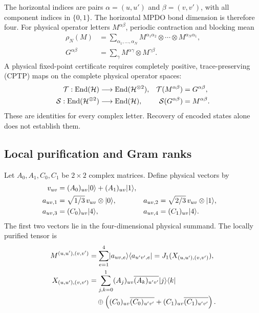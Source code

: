 The horizontal indices are pairs
$\alpha=(u,u')$ and $\beta=(v,v')$, with all component indices in
$\{0,1\}$. The horizontal MPDO bond dimension is therefore four.
For physical operator letters $M^{\alpha\beta}$, periodic contraction
and blocking mean
\begin{align}
	\rho_N(M)
	 & =\sum_{\alpha_1,\ldots,\alpha_N}
	M^{\alpha_1\alpha_2}\otimes\cdots\otimes
	M^{\alpha_N\alpha_1},
	\nonumber                                                \\
	G^{\alpha\beta}
	 & =\sum_\gamma M^{\alpha\gamma}\otimes M^{\gamma\beta}.
	\label{eq:contractions}
\end{align}
A physical fixed-point certificate requires completely positive,
trace-preserving (CPTP) maps on the complete physical operator spaces:
\begin{align}
	\mathcal{T}:\operatorname{End}(\mathcal{H})            & \longrightarrow\operatorname{End}(\mathcal{H}^{\otimes2}),
	                             &
	\mathcal{T}(M^{\alpha\beta})       & =G^{\alpha\beta},
	\nonumber                                                             \\
	\mathcal{S}:\operatorname{End}(\mathcal{H}^{\otimes2}) & \longrightarrow\operatorname{End}(\mathcal{H}),
	                             &
	\mathcal{S}(G^{\alpha\beta})       & =M^{\alpha\beta}.
	\label{eq:rfp}
\end{align}
These are identities for every complex letter. Recovery of encoded
states alone does not establish them.

\subsection{Local purification and Gram ranks}

Let $A_0,A_1,C_0,C_1$ be $2\times2$ complex matrices. Define physical
vectors by
\begin{align}
	v_{uv}   & =(A_0)_{uv}\lvert0\rangle+(A_1)_{uv}\lvert1\rangle,
	\nonumber                                    \\
	a_{uv,1} & =\sqrt{1/3}\,v_{uv}\otimes\lvert0\rangle,
	         &
	a_{uv,2} & =\sqrt{2/3}\,v_{uv}\otimes\lvert1\rangle,
	\nonumber                                    \\
	a_{uv,3} & =(C_0)_{uv}\lvert4\rangle,
	         &
	a_{uv,4} & =(C_1)_{uv}\lvert4\rangle.
	\label{eq:purification}
\end{align}
The first two vectors lie in the four-dimensional physical summand.
The locally purified tensor is
\begin{align}
	M^{(u,u'),(v,v')}
	 & =\sum_{e=1}^4
	\lvert a_{uv,e}\rangle\langle a_{u'v',e}\rvert
	=J_1(X_{(u,u'),(v,v')}),
	\nonumber                                         \\
	X_{(u,u'),(v,v')}
	 & =\sum_{j,k=0}^1
	    (A_j)_{uv}\overline{(A_k)_{u'v'}}\lvert j\rangle\langle k\rvert
	\nonumber                                         \\
	 & \quad\oplus
	\left((C_0)_{uv}\overline{(C_0)_{u'v'}}
	                +(C_1)_{uv}\overline{(C_1)_{u'v'}}\right).
	\label{eq:letters}
\end{align}

